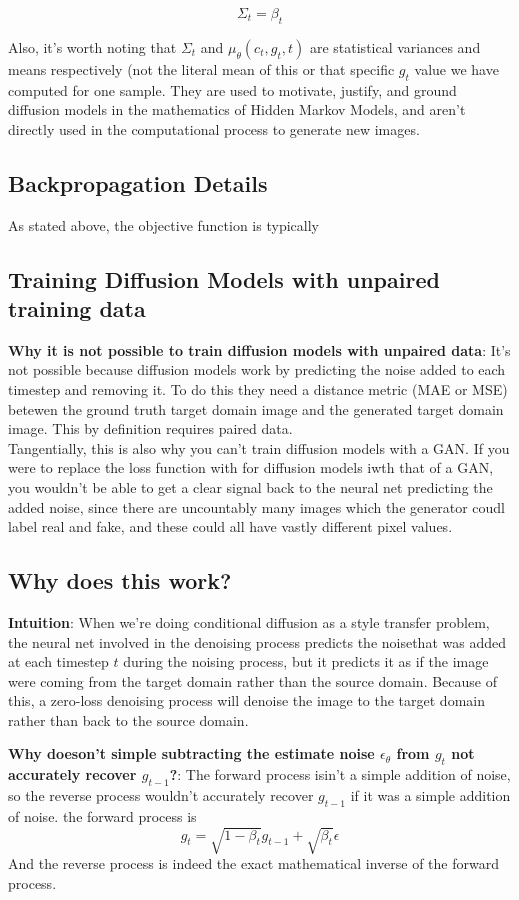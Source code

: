 \documentclass[12pt]{article}
\begin{document}
\[\Sigma_t = \beta_t\]

Also, it's worth noting that \(\Sigma_t\) and \(\mu_\theta(c_t, g_t,t)\) are statistical variances and means respectively (not the literal mean of this or that specific \(g_t\) value we have computed for one sample. They are used to motivate, justify, and ground diffusion models in the mathematics of Hidden Markov Models, and aren't directly used in the computational process to generate new images.

\subsection{Backpropagation Details}
As stated above, the objective function is typically 
\subsection{Training Diffusion Models with unpaired training data}
\textbf{Why it is not possible to train diffusion models with unpaired data}: It's not possible because diffusion  models work by predicting the noise added to each timestep and removing it. To do this they need a distance metric (MAE or MSE) betewen the ground truth target domain image and the generated target domain image. This by definition requires paired data. \\

Tangentially, this is also why you can't train diffusion models with a GAN. If you were to replace the loss function with for diffusion models iwth that of a GAN, you wouldn't be able to get a clear signal back to the neural net predicting the added noise, since there are uncountably many images which the generator coudl label real and fake, and these could all have vastly different pixel values. 
\subsection{Why does this work?}

\textbf{Intuition}: When we're doing conditional diffusion as a style transfer problem, the neural net involved in the denoising process predicts the noisethat was added at each timestep \(t\) during the noising process, but it predicts it as if the image were coming from the target domain rather than the source domain. Because of this, a zero-loss denoising process will denoise the image to the target domain rather than back to the source domain.

\textbf{Why doeson't simple subtracting the estimate noise \(\epsilon_\theta\) from \(g_t\) not accurately recover \(g_{t-1}\)?}: The forward process isin't a simple addition of noise, so the reverse process wouldn't accurately recover \(g_{t-1}\) if it was a simple addition of noise. the forward process is 
\[g_t = \sqrt{1 - \beta_t}g_{t-1} + \sqrt{\beta_t}\epsilon\] And the reverse process is indeed the exact mathematical inverse of the forward process.
\end{document}
